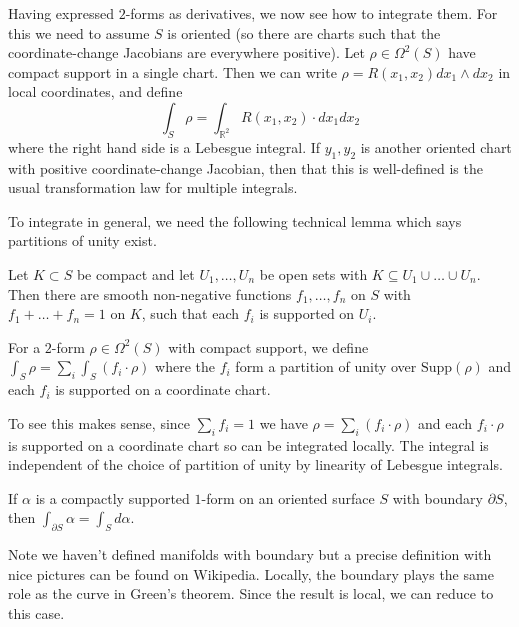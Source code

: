 Having expressed \(2\)-forms as derivatives, we now see how to integrate them.
For this we need to assume \(S\) is oriented (so there are charts such that the
coordinate-change Jacobians are everywhere positive). Let \(\rho\in
\Omega^2(S)\) have compact support in a single chart. Then we can write
\(\rho=R(x_1,x_2)dx_1\wedge dx_2\) in local coordinates, and define
\[
    \int_S\rho = \int_{\mathbb{R}^2}R(x_1,x_2)\cdot dx_1 dx_2
\]
where the right hand side is a Lebesgue integral. If \(y_1,y_2\) is another
oriented chart with positive coordinate-change Jacobian, then that this is
well-defined is the usual transformation law for multiple integrals.

To integrate in general, we need the following technical lemma which says
partitions of unity exist.

\begin{lemma}
    Let \(K\subset S\) be compact and let \(U_1,\ldots,U_n\) be open sets with
    \(K\subseteq U_1\cup \ldots \cup U_n\). Then there are smooth non-negative
    functions \(f_1,\ldots,f_n\) on \(S\) with \(f_1+\ldots+f_n=1\) on \(K\),
    such that each \(f_i\) is supported on \(U_i\).
\end{lemma}

\begin{definition}
    For a \(2\)-form \(\rho\in \Omega^2(S)\) with compact support, we define
    \(\int_S\rho = \sum_i\int_S(f_i\cdot \rho)\) where the \(f_i\) form a
    partition of unity over \(\text{Supp}(\rho)\) and each \(f_i\) is supported
    on a coordinate chart.
\end{definition}

To see this makes sense, since \(\sum_i f_i =1\) we have \(\rho=\sum_i
(f_i\cdot \rho)\) and each \(f_i\cdot \rho\) is supported on a coordinate chart
so can be integrated locally. The integral is independent of the choice of
partition of unity by linearity of Lebesgue integrals.

\begin{theorem}
    If \(\alpha\) is a compactly supported \(1\)-form on an oriented surface
    \(S\) with boundary \(\partial S\), then \(\int_{\partial S}\alpha =
    \int_Sd\alpha.\)
\end{theorem}

Note we haven't defined manifolds with boundary but a precise definition with
nice pictures can be found on Wikipedia. Locally, the boundary plays the same
role as the curve in Green's theorem. Since the result is local, we can reduce
to this case.


